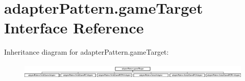 \hypertarget{interfaceadapter_pattern_1_1game_target}{}\section{adapter\+Pattern.\+game\+Target Interface Reference}
\label{interfaceadapter_pattern_1_1game_target}
Inheritance diagram for adapter\+Pattern.\+game\+Target\+:\begin{figure}[H]
\begin{center}
\leavevmode
\includegraphics[height=0.752688cm]{interfaceadapter_pattern_1_1game_target}
\end{center}
\end{figure}
